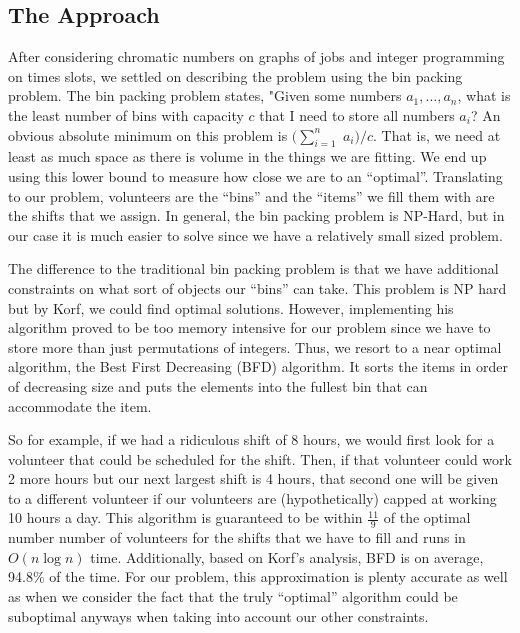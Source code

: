 \documentclass[12pt]{article}
\theoremstyle{definition}
\begin{document}
\begin{multicols}{2}
\section{The Approach}
After considering chromatic numbers on graphs of jobs and integer programming on times slots, we settled on describing the problem using the bin packing problem.
The bin packing problem states, "Given some numbers $a_1, \ldots, a_n$, what is the least number of bins with capacity $c$ that I need to store all numbers $a_i$?
An obvious absolute minimum on this problem is $\big(\sum_{i = 1}^{n}\;a_i\big)/c$.
That is, we need at least as much space as there is volume in the things we are fitting.
We end up using this lower bound to measure how close we are to an ``optimal''.
Translating to our problem, volunteers are the ``bins'' and the ``items'' we fill them with are the shifts that we assign.
In general, the bin packing problem is NP-Hard, but in our case it is much easier to solve since we have a relatively small sized problem.

The difference to the traditional bin packing problem is that we have additional constraints on what sort of objects our ``bins'' can take.
This problem is NP hard but by Korf, we could find optimal solutions.
However, implementing his algorithm proved to be too memory intensive for our problem since we have to store more than just permutations of integers.
Thus, we resort to a near optimal algorithm, the Best First Decreasing (BFD) algorithm.
It sorts the items in order of decreasing size and puts the elements into the fullest bin that can accommodate the item.

So for example, if we had a ridiculous shift of 8 hours, we would first look for a volunteer that could be scheduled for the shift.
Then, if that volunteer could work 2 more hours but our next largest shift is 4 hours, that second one will be given to a different volunteer if our volunteers are (hypothetically) capped at working 10 hours a day.
This algorithm is guaranteed to be within $\frac{11}{9}$ of the optimal number number of volunteers for the shifts that we have to fill and runs in $O(n\log n)$ time.
Additionally, based on Korf's analysis, BFD is on average, 94.8\% of the time.
For our problem, this approximation is plenty accurate as well as when we consider the fact that the truly ``optimal'' algorithm could be suboptimal anyways when taking into account our other constraints.



\end{multicols}
\end{document}
